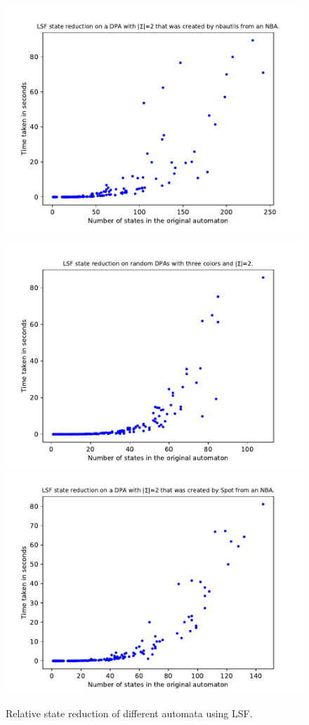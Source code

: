 \begin{figure}
\begin{minipage}{0.49\textwidth}
		\includegraphics[page=6,height=.3\textheight]{../data/analysis/lsf/detnbaut_ap1.pdf} 
		\caption{Relative state reduction of different automata using LSF.}
		\label{exp:fig:lsf_size_hist}
	\end{minipage}
	\hfill
	\begin{minipage}{0.49\textwidth}
		\includegraphics[page=2,height=.3\textheight]{../data/analysis/lsf/gendet_ap1.pdf} 
		\includegraphics[page=2,height=.3\textheight]{../data/analysis/lsf/detspot_ap1.pdf} 

\end{minipage}
\end{figure}
